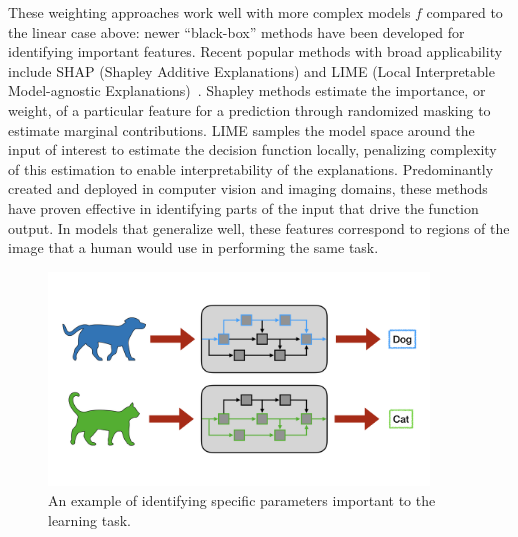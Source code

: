 These weighting approaches work well with more complex models $f$ compared to the linear case above: newer ``black-box'' methods have been developed for identifying important features.
Recent popular methods with broad applicability include SHAP (Shapley Additive Explanations) and LIME (Local Interpretable Model-agnostic Explanations)~\citep{shap,lime}.
Shapley methods estimate the importance, or weight, of a particular feature for a prediction through randomized masking to estimate marginal contributions.
LIME samples the model space around the input of interest to estimate the decision function locally, penalizing complexity of this estimation to enable interpretability of the explanations.
Predominantly created and deployed in computer vision and imaging domains, these methods have proven effective in identifying parts of the input that drive the function output.
In models that generalize well, these features correspond to regions of the image that a human would use in performing the same task.


\begin{figure}
    \centering
    \includegraphics[trim={0 3cm 0 3cm},clip,width=0.9\textwidth]{1_intro/figs/param_select.png}
    \caption[Visualization of parameter selection]{An example of identifying specific parameters important to the learning task.}
    \label{fig:param_select}
\end{figure}
